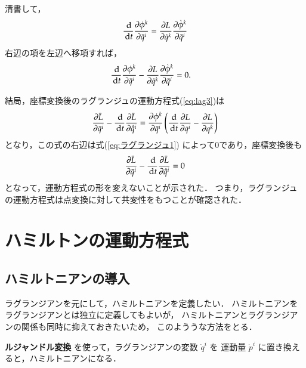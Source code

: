                         清書して，
                \begin{align*}
                     \frac{\,\mathrm{d} }{\,\mathrm{d} t}\frac{\partial \phi^{k}}{\partial \bar{q}^{i}}
                    =\frac{\partial L}{\partial \dot{q}^{k}}\frac{\partial \dot{\phi}^{k}}{\partial \bar{q}^{i}}
                \end{align*}
                        右辺の項を左辺へ移項すれば，
                \begin{align}
                    \frac{\,\mathrm{d} }{\,\mathrm{d} t}\frac{\partial \phi^{k}}{\partial \bar{q}^{i}}-\frac{\partial L}{\partial \dot{q}^{k}}\frac{\partial \dot{\phi}^{k}}{\partial \bar{q}^{i}}
                    &=0.
                \end{align}

            結局，座標変換後のラグランジュの運動方程式(\ref{eq:lag3})は
                \begin{align}\label{eq:lag4}
                \frac{\rd \bar{L}}{\rd \bar{q}^{i}}
                -\frac{\df }{\df t} \frac{\rd \bar{L}}{\rd \dot{\bar{q}}^{i}}
                    =\frac{\rd \phi^{k}}{\rd \bar{q}^{i}}\left(\frac{\df }{\df t}\frac{\rd L}{\rd \dot{q}^{i}} -\frac{\rd L}{\rd q^{k}}\right)
                \end{align}
            となり，この式の右辺は式(\ref{eq:ラグランジュ1})
            によって0であり，座標変換後も
                \begin{align}\label{eq:lag41}
                \frac{\rd \bar{L}}{\rd \bar{q}^{i}}
                -\frac{\df }{\df t} \frac{\rd \bar{L}}{\rd \dot{\bar{q}}^{i}}
                    =0
                \end{align}
            となって，運動方程式の形を変えないことが示された．
            つまり，ラグランジュの運動方程式は点変換に対して共変性をもつことが確認された．

    \section{ハミルトンの運動方程式}
        \subsection{ハミルトニアンの導入}
            \begin{mycomment}
                ラグランジアンを元にして，ハミルトニアンを定義したい．
                ハミルトニアンをラグランジアンとは独立に定義してもよいが，
                ハミルトニアンとラグランジアンの関係も同時に抑えておきたいため，
                このよううな方法をとる．

                 \textbf{ルジャンドル変換} を使って，ラグランジアンの変数 $\dot{q}^{i}$ を
                運動量 $\dot{p}^{i}$ に置き換えると，ハミルトニアンになる．
            \end{mycomment}

